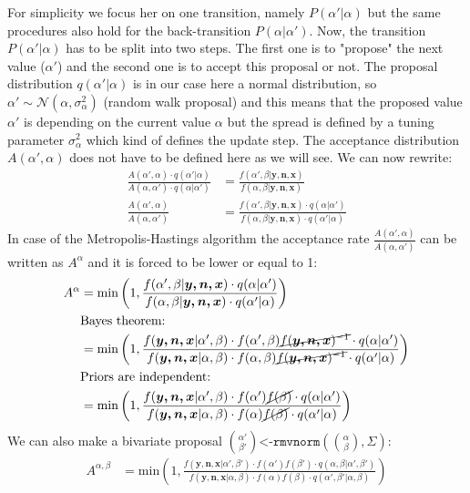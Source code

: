 \documentclass{article}\usepackage[]{graphicx}\usepackage[]{xcolor}
\begin{document}
\begin{multicols*}{2}
For simplicity we focus her on one transition, namely $P(\alpha'|\alpha)$ but the same procedures also hold for the back-transition $P(\alpha|\alpha')$. Now, the transition $P(\alpha'|\alpha)$ has to be split into two steps. The first one is to "propose" the next value ($\alpha'$) and the second one is to accept this proposal or not. The proposal distribution $q(\alpha'|\alpha)$ is in our case here a normal distribution, so $\alpha'\sim\mathcal{N}(\alpha,\sigma_{\alpha}^2)$ (random walk proposal) and this means that the proposed value $\alpha'$ is depending on the current value $\alpha$ but the spread is defined by a tuning parameter $\sigma_{\alpha}^2$ which kind of defines the update step. The acceptance distribution $A(\alpha',\alpha)$ does not have to be defined here as we will see. We can now rewrite:
\begin{align*}
\frac{A(\alpha',\alpha)\cdot q(\alpha'|\alpha)}{A(\alpha,\alpha')\cdot q(\alpha|\alpha')}&=\frac{f(\alpha',\beta|\boldsymbol{y,n,x})}{f(\alpha,\beta|\boldsymbol{y,n,x})}\\
\frac{A(\alpha',\alpha)}{A(\alpha,\alpha')}&=\frac{f(\alpha',\beta|\boldsymbol{y,n,x})\cdot q(\alpha|\alpha')}{f(\alpha,\beta|\boldsymbol{y,n,x})\cdot q(\alpha'|\alpha)}
\end{align*}
In case of the Metropolis-Hastings algorithm the acceptance rate $\frac{A(\alpha',\alpha)}{A(\alpha,\alpha')}$ can be written as $A^{\alpha}$ and it is forced to be lower or equal to 1:
\begin{align*}
A^{\alpha}&=\text{min}\left(1,\frac{f(\alpha',\beta|\boldsymbol{y,n,x})\cdot q(\alpha|\alpha')}{f(\alpha,\beta|\boldsymbol{y,n,x})\cdot q(\alpha'|\alpha)}\right)\\
&\text{Bayes theorem:}\\
&=\text{min}\left(1,\frac{f(\boldsymbol{y,n,x}|\alpha',\beta)\cdot f(\alpha',\beta)\cancel{f(\boldsymbol{y,n,x})^{-1}}\cdot q(\alpha|\alpha')}{f(\boldsymbol{y,n,x}|\alpha,\beta)\cdot f(\alpha,\beta)\cancel{f(\boldsymbol{y,n,x})^{-1}}\cdot q(\alpha'|\alpha)}\right)\\
&\text{Priors are independent:}\\
&=\text{min}\left(1,\frac{f(\boldsymbol{y,n,x}|\alpha',\beta)\cdot f(\alpha')\cancel{f(\beta)}\cdot q(\alpha|\alpha')}{f(\boldsymbol{y,n,x}|\alpha,\beta)\cdot f(\alpha)\cancel{f(\beta)}\cdot q(\alpha'|\alpha)}\right)
\end{align*}
We can also make a bivariate proposal ${\alpha'\choose \beta'}\texttt{<-rmvnorm}({\alpha\choose\beta}, \Sigma)$:
\begin{align*}
A^{\alpha,\beta}&=\text{min}\left(1,\frac{f(\boldsymbol{y,n,x}|\alpha',\beta')\cdot f(\alpha')f(\beta')\cdot q(\alpha,\beta|\alpha',\beta')}{f(\boldsymbol{y,n,x}|\alpha,\beta)\cdot f(\alpha)f(\beta)\cdot q(\alpha',\beta'|\alpha,\beta)}\right)
\end{align*}


\end{multicols*}
\end{document}
